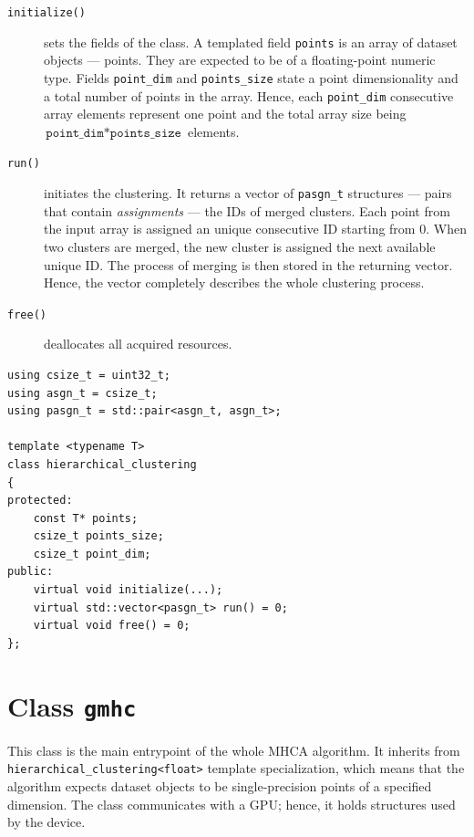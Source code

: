 \begin{description}
	\item[\texttt{initialize()}] sets the fields of the class. A templated field \texttt{points} is an array of dataset objects --- points. They are expected to be of a floating-point numeric type. Fields \texttt{point\_dim} and \texttt{points\_size} state a point dimensionality and a total number of points in the array. Hence, each \texttt{point\_dim} consecutive array elements represent one point and the total array size being $\texttt{point\_dim}*\texttt{points\_size}$ elements.
	
	\item[\texttt{run()}] initiates the clustering. It returns a vector of \texttt{pasgn\_t} structures --- pairs that contain \emph{assignments} --- the IDs of merged clusters. Each point from the input array is assigned an unique consecutive ID starting from $0$. When two clusters are merged, the new cluster is assigned the next available unique ID. The process of merging is then stored in the returning vector. Hence, the vector completely describes the whole clustering process.
	
	\item[\texttt{free()}] deallocates all acquired resources.
\end{description}

\begin{lstlisting}[caption={A summary of \texttt{hierarchical\_clustering} header file.},label={lst03:hc}]
using csize_t = uint32_t;
using asgn_t = csize_t;
using pasgn_t = std::pair<asgn_t, asgn_t>;

template <typename T>
class hierarchical_clustering
{
protected:
	const T* points;
	csize_t points_size;
	csize_t point_dim;
public:
	virtual void initialize(...);
	virtual std::vector<pasgn_t> run() = 0;
	virtual void free() = 0;
};
\end{lstlisting}

\section{Class \texttt{gmhc}}

This class is the main entrypoint of the whole MHCA algorithm. It inherits from \texttt{hierarchical\_clustering<float>} template specialization, which means that the algorithm expects dataset objects to be single-precision points of a specified dimension. The class communicates
with a GPU; hence, it holds structures used by the device.

